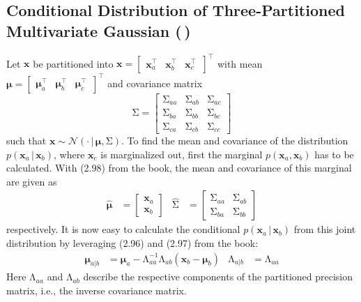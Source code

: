 \documentclass[11pt, a4paper]{scrartcl}
\newcommand{\transposed}{{\!\top\!}}
\renewcommand{\vec}[1]{\bm{#1}}
\newcommand{\mat}[1]{\bm{\mathrm{#1}}}
\newcommand{\given}{\,\vert\,}
\newcommand{\diffstar}{\texorpdfstring{\raisebox{-1pt}{\resizebox{!}{8pt}{\(\star\)}}}{*}}
\newcommand{\twostar}  {(\diffstar\,\diffstar)}
\begin{document}
		\subsection{Conditional Distribution of Three-Partitioned Multivariate Gaussian  \twostar}
			Let \(\vec{x}\) be partitioned into \( \vec{x} = \begin{bmatrix} \vec{x}_a^\transposed & \vec{x}_b^\transposed & \vec{x}_c^{\transposed\,} \end{bmatrix}^\transposed \) with mean \( \vec{\mu} = \begin{bmatrix} \vec{\mu}_a^\transposed & \vec{\mu}_b^\transposed & \vec{\mu}_c^{\transposed\,} \end{bmatrix}^\transposed \) and covariance matrix
			\begin{equation}
				\mat{\Sigma} =
					\begin{bmatrix}
						\mat{\Sigma}_{aa} & \mat{\Sigma}_{ab} & \mat{\Sigma}_{ac} \\
						\mat{\Sigma}_{ba} & \mat{\Sigma}_{bb} & \mat{\Sigma}_{bc} \\
						\mat{\Sigma}_{ca} & \mat{\Sigma}_{cb} & \mat{\Sigma}_{cc}
					\end{bmatrix}
			\end{equation}
			such that \( \vec{x} \sim \mathcal{N}(\cdot \given \vec{\mu}, \mat{\Sigma}) \). To find the mean and covariance of the distribution \( p(\vec{x}_a \given \vec{x}_b) \), where \( \vec{x}_c \) is marginalized out, first the marginal \( p(\vec{x}_a, \vec{x}_b) \) has to be calculated. With (2.98) from the book, the mean and covariance of this marginal are given as
			\begin{align}
				\hat{\vec{\mu}} &= \begin{bmatrix} \vec{x}_a \\ \vec{x}_b \end{bmatrix} &
				\hat{\mat{\Sigma}} &= \begin{bmatrix} \mat{\Sigma}_{aa} & \mat{\Sigma}_{ab} \\ \mat{\Sigma}_{ba} & \mat{\Sigma}_{bb} \end{bmatrix}
			\end{align}
			respectively. It is now easy to calculate the conditional \( p(\vec{x}_a \given \vec{x}_b) \) from this joint distribution by leveraging (2.96) and (2.97) from the book:
			\begin{align}
				\vec{\mu}_{a \vert b} &= \vec{\mu}_a - \mat{\Lambda}_{aa}^{-1} \mat{\Lambda}_{ab} (\vec{x}_b - \vec{\mu}_b) &
				\mat{\Lambda}_{a \vert b} &= \mat{\Lambda}_{aa}
			\end{align}
			Here \( \mat{\Lambda}_{aa} \) and \( \mat{\Lambda}_{ab} \) describe the respective components of the partitioned precision matrix, i.e., the inverse covariance matrix.
\end{document}
